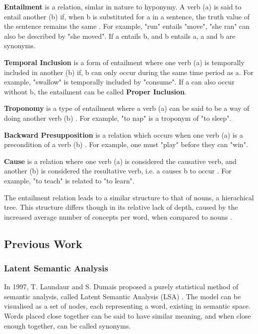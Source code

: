 \documentclass[]{article}
\begin{document}
\textbf{Entailment} is a relation, simlar in nature to hyponymy. A verb (a) is said to entail another (b) if, when b is substituted for a in a sentence, the truth value of the sentence remains the same \cite{WN4Verbs}. For example, "run" entails "move", "she ran" can also be described by "she moved". If a entails b, and b entails a, a and b are synonyms.

\textbf{Temporal Inclusion} is a form of entailment where one verb (a) is temporally included in another (b) if, b can only occur during the same time period as a\cite{WN4Verbs}. For example, "swallow" is temporally included by "consume". If a can also occur without b, the entailment can be called \textbf{Proper Inclusion}.

\textbf{Troponomy} is a type of entailment where a verb (a) can be said to be a way of doing another verb (b) \cite{WN4Verbs}. For example, "to nap" is a troponym of "to sleep". 

\textbf{Backward Presupposition} is a relation which occurs when one verb (a)  is a precondition of a verb (b) \cite{WN4Verbs}. For example, one must "play" before they can "win".

\textbf{Cause} is a relation where one verb (a) is considered the causative verb, and another (b) is considered the resultative verb, i.e. a causes b to occur \cite{WN4Verbs}. For example, "to teach" is related to "to learn".

The entailment relation leads to a similar structure to that of nouns, a hierachical tree. This structure differs though in its relative lack of depth, caused by the increased average number of concepts per word, when compared to nouns \cite{WN4Verbs}. 

\subsection{Previous Work}
\label{sec:PrevWork}

\subsubsection{Latent Semantic Analysis}
\label{sec:LSA}
In 1997, T. Laundaur and S. Dumais proposed a purely statistical method of semantic analysis, called Latent Semantic Analysis (LSA) \cite{LatentSemanticAnalysis}. The model can be visualised as a set of nodes, each representing a word, existing in semantic space. Words placed close together can be said to have similar meaning, and when close enough together, can be called synonyms. 
\end{document}

